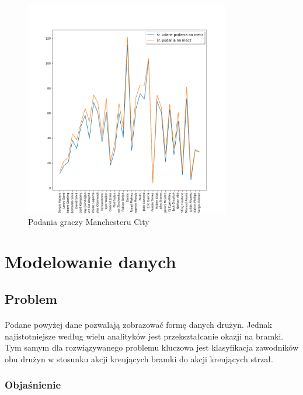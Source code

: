 \documentclass[12pt, letterpaper]{article}
\begin{document}
\pagebreak
\begin{figure}[ht]
    \centering
    \includegraphics[width=0.8\textwidth]{images/UCL_Manchester_passes.png}
    \caption{Podania graczy Manchesteru City}
    \label{fig:enter-label}
\end{figure}
\pagebreak


\section{Modelowanie danych}
\subsection{Problem}
\paragraph{} Podane powyżej dane pozwalają zobrazować formę danych drużyn. Jednak najistotniejsze według wielu analityków jest przekształcanie okazji na bramki. Tym samym dla rozwiązywanego problemu kluczowa jest klasyfikacja zawodników obu drużyn w stosunku akcji kreujących bramki do akcji kreujących strzał.
\subsubsection{Objaśnienie}
\end{document}
